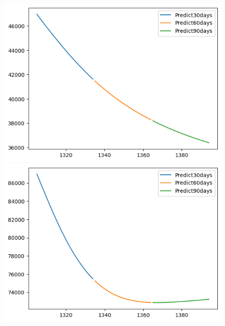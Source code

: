 \begin{figure}[H]
    \hfill
        \begin{minipage}{0.15\textwidth}
    \centering
    \includegraphics[width=1\textwidth]{resources/chapter-5/newdata1/predicted/BIDV_GRU_9_1_30days.png}
    \end{minipage}
    \hfill
    \begin{minipage}{0.15\textwidth}
    \centering
    \includegraphics[width=1\textwidth]{resources/chapter-5/newdata1/predicted/VCB_GRU_7_3_30days.png}
    \end{minipage}
    \hfill
    \begin{minipage}{0.15\textwidth}
    \centering

\end{minipage}
\end{figure}
